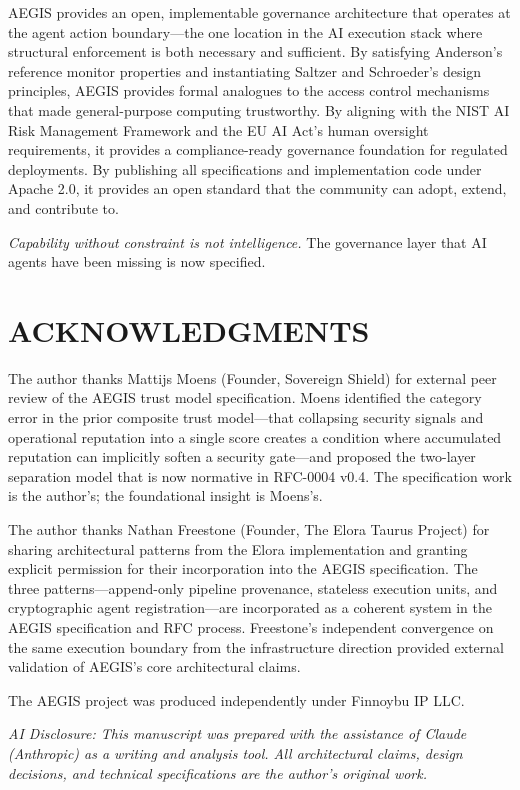 \documentclass{IEEEcsmag}
\begin{document}
AEGIS provides an open, implementable governance architecture that operates at the agent action boundary---the one location in the AI execution stack where structural enforcement is both necessary and sufficient. By satisfying Anderson's reference monitor properties and instantiating Saltzer and Schroeder's design principles, AEGIS provides formal analogues to the access control mechanisms that made general-purpose computing trustworthy. By aligning with the NIST AI Risk Management Framework and the EU AI Act's human oversight requirements, it provides a compliance-ready governance foundation for regulated deployments. By publishing all specifications and implementation code under Apache 2.0, it provides an open standard that the community can adopt, extend, and contribute to.

{\it Capability without constraint is not intelligence.}\texttrademark{} The governance layer that AI agents have been missing is now specified.

\section{ACKNOWLEDGMENTS}

The author thanks Mattijs Moens (Founder, Sovereign Shield) for external peer review of the AEGIS trust model specification. Moens identified the category error in the prior composite trust model---that collapsing security signals and operational reputation into a single score creates a condition where accumulated reputation can implicitly soften a security gate---and proposed the two-layer separation model that is now normative in RFC-0004 v0.4. The specification work is the author's; the foundational insight is Moens's.

The author thanks Nathan Freestone (Founder, The Elora Taurus Project) for sharing architectural patterns from the Elora implementation and granting explicit permission for their incorporation into the AEGIS specification. The three patterns---append-only pipeline provenance, stateless execution units, and cryptographic agent registration---are incorporated as a coherent system in the AEGIS specification and RFC process. Freestone's independent convergence on the same execution boundary from the infrastructure direction provided external validation of AEGIS's core architectural claims.

The AEGIS project was produced independently under Finnoybu IP LLC.

{\it AI Disclosure: This manuscript was prepared with the assistance of Claude (Anthropic) as a writing and analysis tool. All architectural claims, design decisions, and technical specifications are the author's original work.}
\end{document}
